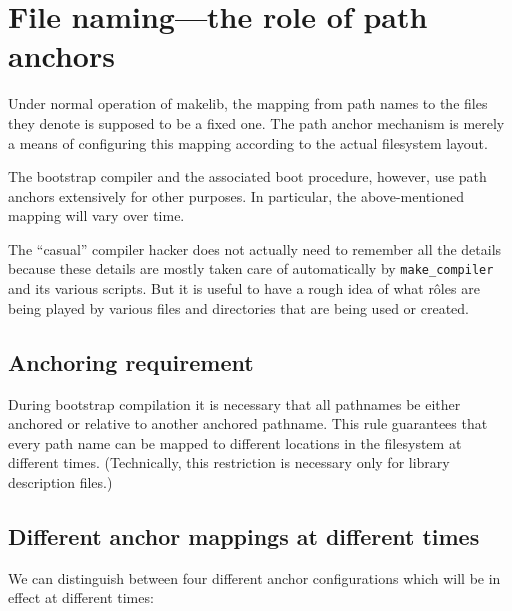 
\section{File naming---the role of path anchors}

Under normal operation of makelib, the mapping from path names to the files
they denote is supposed to be a fixed one.  The path anchor mechanism
is merely a means of configuring this mapping according to the
actual filesystem layout.

The bootstrap compiler and the associated boot procedure, however, use
path anchors extensively for other purposes.  In particular, the
above-mentioned mapping will vary over time.

The ``casual'' compiler hacker does not actually need to remember all
the details because these details are mostly taken care of
automatically by {\tt make_compiler} and its various scripts.
But it is useful to have a rough idea of
what r\^{o}les are being played by various files and directories that
are being used or created.

\subsection{Anchoring requirement}

During bootstrap compilation it is necessary that all pathnames be
either anchored or relative to another anchored pathname.  This rule
guarantees that every path name can be mapped to different locations
in the filesystem at different times.  (Technically, this restriction
is necessary only for library description files.)

\subsection{Different anchor mappings at different times}

We can distinguish between four different anchor configurations which
will be in effect at different times:

